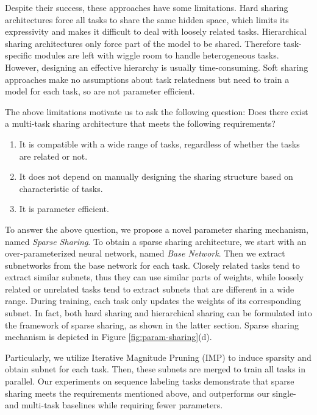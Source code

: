\documentclass[letterpaper]{article} %
\begin{document}
Despite their success, these approaches have some limitations. Hard sharing architectures force all tasks to share the same hidden space, which limits its expressivity and makes it difficult to deal with loosely related tasks. Hierarchical sharing architectures only force part of the model to be shared. Therefore task-specific modules are left with wiggle room to handle heterogeneous tasks. However, designing an effective hierarchy is usually time-consuming. Soft sharing approaches make no assumptions about task relatedness but need to train a model for each task, so are not parameter efficient.

The above limitations motivate us to ask the following question: Does there exist a multi-task sharing architecture that meets the following requirements?
\begin{enumerate}
\item It is compatible with a wide range of tasks, regardless of whether the tasks are related or not.
\item It does not depend on manually designing the sharing structure based on characteristic of tasks.
\item It is parameter efficient.
\end{enumerate}

To answer the above question, we propose a novel parameter sharing mechanism, named \emph{Sparse Sharing}. To obtain a sparse sharing architecture, we start with an over-parameterized neural network, named \emph{Base Network}. Then we extract subnetworks from the base network for each task. Closely related tasks tend to extract similar subnets, thus they can use similar parts of weights, while loosely related or unrelated tasks tend to extract subnets that are different in a wide range. During training, each task only updates the weights of its corresponding subnet. In fact, both hard sharing and hierarchical sharing can be formulated into the framework of sparse sharing, as shown in the latter section. Sparse sharing mechanism is depicted in Figure \ref{fig:param-sharing}(d).

Particularly, we utilize Iterative Magnitude Pruning (IMP) \cite{DBLP:conf/iclr/FrankleC19} to induce sparsity and obtain subnet for each task. Then, these subnets are merged to train all tasks in parallel. Our experiments on sequence labeling tasks demonstrate that sparse sharing meets the requirements mentioned above, and outperforms our single- and multi-task baselines while requiring fewer parameters.
\end{document}
